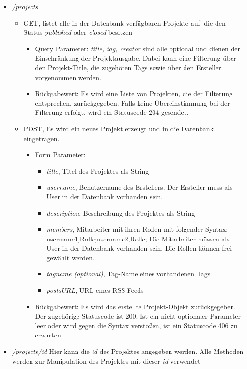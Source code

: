 \documentclass[12pt]{scrartcl}
\begin{document}
\begin{itemize}


		\item \emph{/projects}
		\begin{itemize}
			\item GET, listet alle in der Datenbank verfügbaren Projekte auf, die den Status \emph{published} oder \emph{closed} besitzen
			\begin{itemize}
				\item Query Parameter: \emph{title, tag, creator} sind alle optional und dienen der Einschränkung der Projektausgabe. Dabei kann eine Filterung über den Projekt-Title, die zugehören Tags sowie über den Ersteller vorgenommen werden. 
				\item Rückgabewert: Es wird eine Liste von Projekten, die der Filterung entsprechen, zurückgegeben. Falls keine Übereinstimmung bei der Filterung erfolgt, wird ein Statuscode 204 gesendet. 
			\end{itemize}
			\item POST, Es wird ein neues Projekt erzeugt und in die Datenbank eingetragen.
			\begin{itemize}
				\item Form Parameter:
				\begin{itemize}
					\item  \emph{title}, Titel des Projektes als String
					\item  \emph{username}, Benutzername des Erstellers. Der Ersteller muss als User in der Datenbank vorhanden sein.
					\item  \emph{description}, Beschreibung des Projektes als String
					\item  \emph{members}, Mitarbeiter mit ihren Rollen mit folgender Syntax: username1,Rolle;username2,Rolle; Die Mitarbeiter müssen als User in der Datenbank vorhanden sein. Die Rollen können frei gewählt werden.
					\item  \emph{tagname (optional)}, Tag-Name eines vorhandenen Tags
					\item \emph{postsURL}, URL eines RSS-Feeds 
				\end{itemize}
				\item Rückgabewert: Es wird das erstellte Projekt-Objekt zurückgegeben. Der zugehörige Statuscode ist 200. Ist ein nicht optionaler Parameter leer oder wird gegen die Syntax verstoßen, ist ein Statuscode 406 zu erwarten.  
			\end{itemize}
		\end{itemize}
		\item \emph{/projects/{id}} Hier kann die \emph{id} des Projektes angegeben werden. Alle Methoden werden zur Manipulation des Projektes mit dieser \emph{id} verwendet.

\end{itemize}
\end{document}
